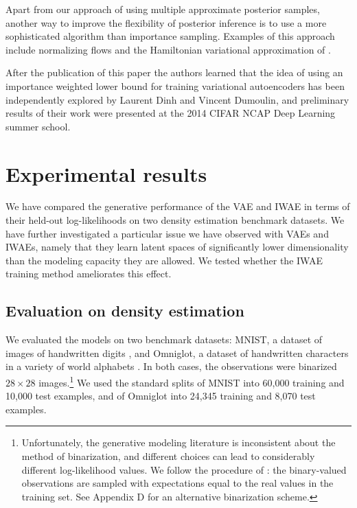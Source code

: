 \documentclass{article} %
\begin{document}
Apart from our approach of using multiple approximate posterior samples, another way to improve the flexibility of posterior inference is to use a more sophisticated algorithm than importance sampling. Examples of this approach include normalizing flows \citep{normalizing_flows} and the Hamiltonian variational approximation of \citet{bridging_the_gap}. 

After the publication of this paper the authors learned that the idea of using an importance weighted lower bound for training variational autoencoders has been independently explored by Laurent Dinh and Vincent Dumoulin, and preliminary results of their work were presented at the 2014 CIFAR NCAP Deep Learning summer school.


\section{Experimental results}
\label{sec:experiments}

We have compared the generative performance of the VAE and IWAE in terms of their held-out log-likelihoods on two density estimation benchmark datasets. We have further investigated a particular issue we have observed with VAEs and IWAEs, namely that they learn latent spaces of significantly lower dimensionality than the modeling capacity they are allowed. We tested whether the IWAE training method ameliorates this effect.


\subsection{Evaluation on density estimation}

We evaluated the models on two benchmark datasets: MNIST, a dataset of images of handwritten digits \citep{mnist}, and Omniglot, a dataset of handwritten characters in a variety of world alphabets \citep{omniglot}. In both cases, the observations were binarized $28 \times 28$ images.\footnote{Unfortunately, the generative modeling literature is inconsistent about the method of binarization, and different choices can lead to considerably different log-likelihood values. We follow the procedure of \citet{ais-rbm}: the binary-valued observations are sampled with expectations equal to the real values in the training set. See Appendix D for an alternative binarization scheme.} We used the standard splits of MNIST into 60,000 training and 10,000 test examples, and of Omniglot into 24,345 training and 8,070 test examples.
\end{document}
